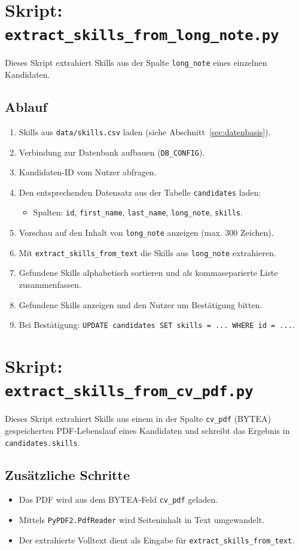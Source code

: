 \documentclass[12pt,a4paper]{article}
\begin{document}
\section{Skript: \texttt{extract\_skills\_from\_long\_note.py}}

Dieses Skript extrahiert Skills aus der Spalte \texttt{long\_note} eines einzelnen Kandidaten.

\subsection{Ablauf}
\begin{enumerate}
    \item Skills aus \texttt{data/skills.csv} laden (siehe Abschnitt~\ref{sec:datenbasis}).
    \item Verbindung zur Datenbank aufbauen (\texttt{DB\_CONFIG}).
    \item Kandidaten-ID vom Nutzer abfragen.
    \item Den entsprechenden Datensatz aus der Tabelle \texttt{candidates} laden:
    \begin{itemize}
        \item Spalten: \texttt{id}, \texttt{first\_name}, \texttt{last\_name}, \texttt{long\_note}, \texttt{skills}.
    \end{itemize}
    \item Vorschau auf den Inhalt von \texttt{long\_note} anzeigen (max. 300 Zeichen).
    \item Mit \texttt{extract\_skills\_from\_text} die Skills aus \texttt{long\_note} extrahieren.
    \item Gefundene Skills alphabetisch sortieren und als kommaseparierte Liste zusammenfassen.
    \item Gefundene Skills anzeigen und den Nutzer um Bestätigung bitten.
    \item Bei Bestätigung: \texttt{UPDATE candidates SET skills = ... WHERE id = ...}.
\end{enumerate}

\section{Skript: \texttt{extract\_skills\_from\_cv\_pdf.py}}

Dieses Skript extrahiert Skills aus einem in der Spalte \texttt{cv\_pdf} (BYTEA) gespeicherten
PDF-Lebenslauf eines Kandidaten und schreibt das Ergebnis in \texttt{candidates.skills}.

\subsection{Zusätzliche Schritte}
\begin{itemize}
    \item Das PDF wird aus dem BYTEA-Feld \texttt{cv\_pdf} geladen.
    \item Mittels \texttt{PyPDF2.PdfReader} wird Seiteninhalt in Text umgewandelt.
    \item Der extrahierte Volltext dient als Eingabe für
          \texttt{extract\_skills\_from\_text}.
\end{itemize}
\end{document}

